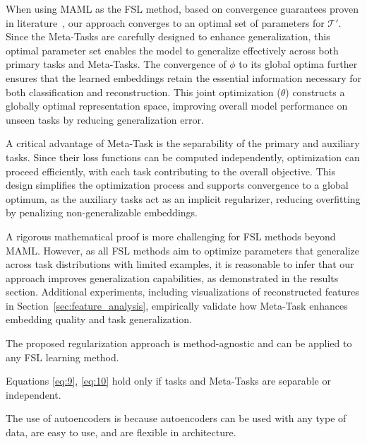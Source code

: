 When using MAML as the FSL method, based on convergence guarantees proven in literature~\cite{wang2022global}, our approach converges to an optimal set of parameters for $\mathcal{T}'$. Since the Meta-Tasks are carefully designed to enhance generalization, this optimal parameter set enables the model to generalize effectively across both primary tasks and Meta-Tasks. The convergence of $\phi$ to its global optima further ensures that the learned embeddings retain the essential information necessary for both classification and reconstruction. This joint optimization ($\theta$) constructs a globally optimal representation space, improving overall model performance on unseen tasks by reducing generalization error.

A critical advantage of Meta-Task is the separability of the primary and auxiliary tasks. Since their loss functions can be computed independently, optimization can proceed efficiently, with each task contributing to the overall objective. This design simplifies the optimization process and supports convergence to a global optimum, as the auxiliary tasks act as an implicit regularizer, reducing overfitting by penalizing non-generalizable embeddings.

A rigorous mathematical proof is more challenging for FSL methods beyond MAML. However, as all FSL methods aim to optimize parameters that generalize across task distributions with limited examples, it is reasonable to infer that our approach improves generalization capabilities, as demonstrated in the results section. Additional experiments, including visualizations of reconstructed features in Section~\ref{sec:feature_analysis}, empirically validate how Meta-Task enhances embedding quality and task generalization.

\begin{remark}{The proposed regularization approach is method-agnostic and can be applied to any FSL learning method.} \end{remark}
\begin{remark}{Equations \eqref{eq:9}, \eqref{eq:10} hold only if tasks and Meta-Tasks are separable or independent.}
\end{remark}
\begin{remark}{The use of autoencoders is because autoencoders can be used with any type of data, are easy to use, and are flexible in architecture.}
\end{remark}

